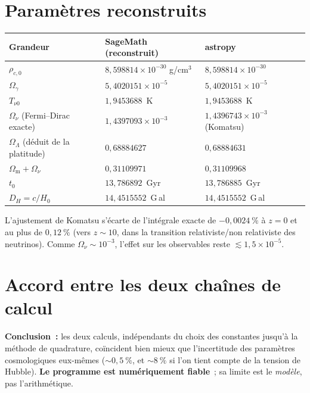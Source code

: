 \documentclass[11pt,a4paper,openany]{report}
\newcommand{\Hzero}{H_{0}}
\newcommand{\Om}{\Omega_{\mathrm{m}}}
\newcommand{\OL}{\Omega_{\Lambda}}
\begin{document}
\section{Paramètres reconstruits}

\begin{center}
\renewcommand{\arraystretch}{1.25}
\begin{tabular}{lll}
\toprule
\textbf{Grandeur} & \textbf{SageMath (reconstruit)} & \textbf{astropy} \\
\midrule
$\rho_{c,0}$ & $8{,}598814\times10^{-30}$ g/cm$^{3}$ & $8{,}598814\times10^{-30}$ \\
$\Omega_{\gamma}$ & $5{,}4020151\times10^{-5}$ & $5{,}4020151\times10^{-5}$ \\
$T_{\nu 0}$ & $1{,}9453688$~K & $1{,}9453688$~K \\
$\Omega_{\nu}$ (Fermi--Dirac exacte) & $1{,}4397093\times10^{-3}$ &
   $1{,}4396743\times10^{-3}$ (Komatsu) \\
$\OL$ (déduit de la platitude) & $0{,}68884627$ & $0{,}68884631$ \\
$\Om + \Omega_{\nu}$ & $0{,}31109971$ & $0{,}31109968$ \\
$t_{0}$ & $13{,}786892$~Gyr & $13{,}786885$~Gyr \\
$D_{H} = c/\Hzero$ & $14{,}4515552$~G\,al & $14{,}4515552$~G\,al \\
\bottomrule
\end{tabular}
\end{center}

\noindent L'ajustement de Komatsu s'écarte de l'intégrale exacte de
$-0{,}0024~\%$ à $z=0$ et au plus de $0{,}12~\%$ (vers $z\sim 10$, dans la
transition relativiste/non relativiste des neutrinos). Comme
$\Omega_{\nu} \sim 10^{-3}$, l'effet sur les observables reste
$\lesssim 1{,}5\times10^{-5}$.

\section{Accord entre les deux chaînes de calcul}



\noindent \textbf{Conclusion~:} les deux calculs, indépendants du choix des
constantes jusqu'à la méthode de quadrature, coïncident bien mieux que
l'incertitude des paramètres cosmologiques eux-mêmes ($\sim 0{,}5~\%$, et
$\sim 8~\%$ si l'on tient compte de la tension de Hubble). \textbf{Le programme
est numériquement fiable}~; sa limite est le \emph{modèle}, pas l'arithmétique.
\end{document}
